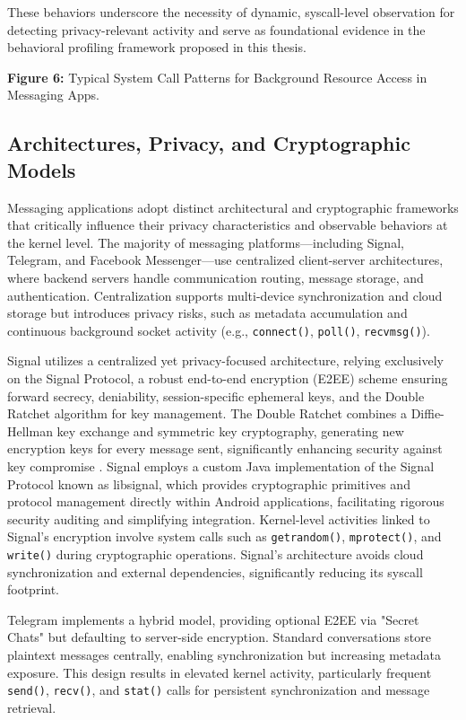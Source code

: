 \documentclass[a4paper,12pt]{report}
\begin{document}
These behaviors underscore the necessity of dynamic, syscall-level observation for detecting privacy-relevant activity and serve as foundational evidence in the behavioral profiling framework proposed in this thesis.

\textbf{Figure 6:} Typical System Call Patterns for Background Resource Access in Messaging Apps.

\subsection{Architectures, Privacy, and Cryptographic Models}
Messaging applications adopt distinct architectural and cryptographic frameworks that critically influence their privacy characteristics and observable behaviors at the kernel level. The majority of messaging platforms—including Signal, Telegram, and Facebook Messenger—use centralized client-server architectures, where backend servers handle communication routing, message storage, and authentication. Centralization supports multi-device synchronization and cloud storage but introduces privacy risks, such as metadata accumulation and continuous background socket activity (e.g., \texttt{connect()}, \texttt{poll()}, \texttt{recvmsg()}).

Signal utilizes a centralized yet privacy-focused architecture, relying exclusively on the Signal Protocol, a robust end-to-end encryption (E2EE) scheme ensuring forward secrecy, deniability, session-specific ephemeral keys, and the Double Ratchet algorithm for key management. The Double Ratchet combines a Diffie-Hellman key exchange and symmetric key cryptography, generating new encryption keys for every message sent, significantly enhancing security against key compromise \cite{signalwhitepaper}. Signal employs a custom Java implementation of the Signal Protocol known as libsignal, which provides cryptographic primitives and protocol management directly within Android applications, facilitating rigorous security auditing and simplifying integration. Kernel-level activities linked to Signal’s encryption involve system calls such as \texttt{getrandom()}, \texttt{mprotect()}, and \texttt{write()} during cryptographic operations. Signal's architecture avoids cloud synchronization and external dependencies, significantly reducing its syscall footprint.

Telegram implements a hybrid model, providing optional E2EE via "Secret Chats" but defaulting to server-side encryption. Standard conversations store plaintext messages centrally, enabling synchronization but increasing metadata exposure. This design results in elevated kernel activity, particularly frequent \texttt{send()}, \texttt{recv()}, and \texttt{stat()} calls for persistent synchronization and message retrieval.
\end{document}
